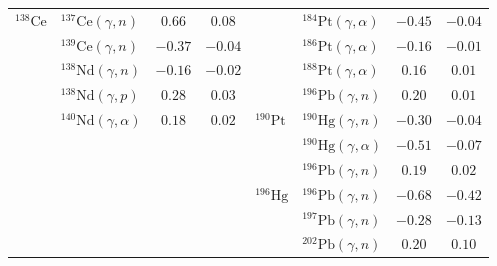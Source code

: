 \begin{table}
\begin{tabular}{llcc|llcc}
    $^{138}\mathrm{Ce}$ & $^{137}\mathrm{Ce}(\gamma,n)$ & $0.66$ & $0.08$ & $ $ & $^{184}\mathrm{Pt}(\gamma,\alpha)$ & $-0.45$ & $-0.04$ \\ 
    $ $ & $^{139}\mathrm{Ce}(\gamma,n)$ & $-0.37$ & $-0.04$ & $ $ & $^{186}\mathrm{Pt}(\gamma,\alpha)$ & $-0.16$ & $-0.01$ \\ 
    $ $ & $^{138}\mathrm{Nd}(\gamma,n)$ & $-0.16$ & $-0.02$ & $ $ & $^{188}\mathrm{Pt}(\gamma,\alpha)$ & $0.16$ & $0.01$ \\ 
    $ $ & $^{138}\mathrm{Nd}(\gamma,p)$ & $0.28$ & $0.03$ & $ $ & $^{196}\mathrm{Pb}(\gamma,n)$ & $0.20$ & $0.01$ \\ 
    $ $ & $^{140}\mathrm{Nd}(\gamma,\alpha)$ & $0.18$ & $0.02$ & $^{190}\mathrm{Pt}$ & $^{190}\mathrm{Hg}(\gamma,n)$ & $-0.30$ & $-0.04$ \\ 
    $ $ & $ $ &  &  & $ $ & $^{190}\mathrm{Hg}(\gamma,\alpha)$ & $-0.51$ & $-0.07$ \\ 
    $ $ & $ $ &  &  & $ $ & $^{196}\mathrm{Pb}(\gamma,n)$ & $0.19$ & $0.02$ \\ 
    $ $ & $ $ &  &  & $^{196}\mathrm{Hg}$ & $^{196}\mathrm{Pb}(\gamma,n)$ & $-0.68$ & $-0.42$ \\ 
    $ $ & $ $ &  &  & $ $ & $^{197}\mathrm{Pb}(\gamma,n)$ & $-0.28$ & $-0.13$ \\ 
    $ $ & $ $ &  &  & $ $ & $^{202}\mathrm{Pb}(\gamma,n)$ & $0.20$ & $0.10$ \\ 
    \toprule
    \end{tabular}
\end{table}


